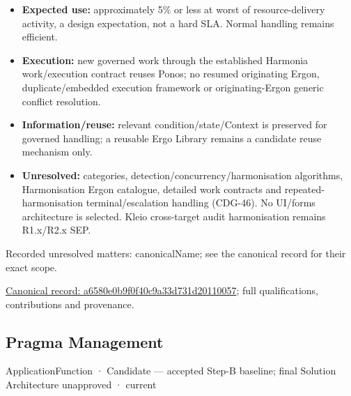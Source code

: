 \begin{itemize}


\item \textbf{Expected use:} approximately 5\% or less at worst of resource-delivery activity,
  a design expectation, not a hard SLA. Normal handling remains efficient.

\item \textbf{Execution:} new governed work through the established Harmonia work/execution
  contract reuses Ponos; no resumed originating Ergon, duplicate/embedded execution
  framework or originating-Ergon generic conflict resolution.

\item \textbf{Information/reuse:} relevant condition/state/Context is preserved for governed
  handling; a reusable Ergo Library remains a candidate reuse mechanism only.

\item \textbf{Unresolved:} categories, detection/concurrency/harmonisation algorithms,
  Harmonisation Ergon catalogue, detailed work contracts and repeated-harmonisation
  terminal/escalation handling (CDG-46). No UI/forms architecture is selected.
  Kleio cross-target audit harmonisation remains R1.x/R2.x SEP.

\end{itemize}

{\small Recorded unresolved matters: canonicalName; see the canonical record for their exact scope.}\par
{\footnotesize \href{../../../../continuum/application/application-function/a6580e0b9f0f40c9a33d731d20110057.md}{Canonical record: a6580e0b9f0f40c9a33d731d20110057}; full qualifications, contributions and provenance.}\par
\subsection{Pragma Management}

\label{element:ab0cdaa7ed4149ee856216efa5a265c4}
{\small ApplicationFunction · Candidate — accepted Step-B baseline; final Solution Architecture unapproved · current}\par

